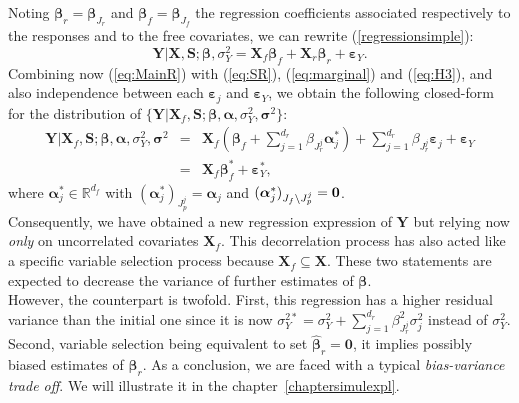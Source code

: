 \documentclass[12pt,a4paper]{report}
\begin{document}
\vspace{3mm}

Noting $\boldsymbol{\beta}_r=\boldsymbol{\beta}_{J_r}$ and $\boldsymbol{\beta}_f=\boldsymbol{\beta}_{J_f}$ the regression coefficients associated respectively to the responses and to the free covariates, we can rewrite (\ref{regressionsimple}):
\begin{equation}
			\boldsymbol{Y}{|\boldsymbol{X},\boldsymbol{S}};\boldsymbol{\beta},\sigma_Y^2=\boldsymbol{X}_f\boldsymbol{\beta}_f+\boldsymbol{X}_r\boldsymbol{\beta}_r+\boldsymbol{\varepsilon}_Y. \label{eq:MainR}
\end{equation}
Combining now (\ref{eq:MainR}) with (\ref{eq:SR}), (\ref{eq:marginal}) and (\ref{eq:H3}), and also independence between each $\boldsymbol{\varepsilon}_j$ and $\boldsymbol{\varepsilon}_Y$, we obtain the following closed-form for the distribution of $\{\boldsymbol{Y} |\boldsymbol{X}_f,\boldsymbol{S};\boldsymbol{\beta},\boldsymbol{\alpha},\sigma_Y^2,\boldsymbol{\sigma}^2\}$:
\begin{eqnarray}
	\boldsymbol{Y}|\boldsymbol{X}_f,\boldsymbol{S};\boldsymbol{\beta},\boldsymbol{\alpha},\sigma_Y^2,\boldsymbol{\sigma}^2&=&\boldsymbol{X}_f (\boldsymbol{\beta}_f+ \sum_{j =1}^{d_r}\beta_{J_r^j}\boldsymbol{\alpha}_j^*)+  \sum_{j =1}^{d_r}\beta_{J_r^j}\boldsymbol{\varepsilon}_j+\boldsymbol{\varepsilon}_Y \label{eq:Trueexpl} \\
	&=&\boldsymbol{X}_f\boldsymbol{\beta}_f^*+\boldsymbol{\varepsilon}_Y^*,\label{eq:modexpl}
\end{eqnarray}
where $\boldsymbol{\alpha}^*_j \in \mathbb{R}^{d_f}$ with $(\boldsymbol{\alpha}_j^*)_{J_p^j}=\boldsymbol{\alpha}_j $ and $(\boldsymbol{\alpha}_j^*)_{J_f\setminus J_p^j}=\bf 0  $. \\

Consequently, we have obtained a new regression expression of $\boldsymbol{Y}$ but relying now {\it only} on uncorrelated covariates $\boldsymbol{X}_f$. This decorrelation process has also acted like a specific variable selection process because $\boldsymbol{X}_f \subseteq \boldsymbol{X}$. These two statements are expected to decrease the variance of further estimates of $\boldsymbol{\beta}$.\\

 However, the counterpart is twofold. First, this regression has a higher residual variance than the initial one since it is now $\sigma^{2*}_Y=\sigma^2_Y+\sum_{j =1}^{d_r}\beta_{J_r^j}^2\sigma^2_j$ instead of $\sigma^2_Y$. Second, variable selection being equivalent to set $\hat{\boldsymbol{\beta}}_r=\boldsymbol{0}$, it implies possibly biased estimates of $\boldsymbol{\beta}_r$. As a conclusion, we are faced with a typical {\it bias-variance trade off}. We will illustrate it in the chapter~\ref{chaptersimulexpl}.\\
\end{document}
